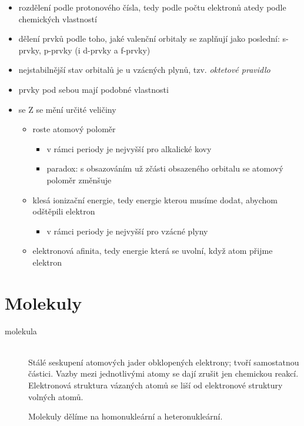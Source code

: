 \documentclass[DIV=8]{scrreprt}
\begin{document}
\begin{itemize}[nosep]
    \item rozdělení podle protonového čísla, tedy podle počtu elektronů atedy podle chemických vlastností
    \item dělení prvků podle toho, jaké valenční orbitaly se zaplňují jako poslední: s-prvky, p-prvky (i d-prvky a f-prvky)
    \item nejstabilnější stav orbitalů je u vzácných plynů, tzv. \emph{oktetové pravidlo}
    \item prvky pod sebou mají podobné vlastnosti
    \item se Z se mění určité veličiny
\begin{itemize}[nosep]
    \item roste atomový poloměr
\begin{itemize}[nosep]
    \item v rámci periody je nejvyšší pro alkalické kovy
    \item paradox: s obsazováním už zčásti obsazeného orbitalu se atomový poloměr změnšuje
\end{itemize}

    \item klesá ionizační energie, tedy energie kterou musíme dodat, abychom odštěpili elektron
\begin{itemize}[nosep]
    \item v rámci periody je nejvyšší pro vzácné plyny
\end{itemize}

    \item elektronová afinita, tedy energie která se uvolní, když atom přijme elektron
\end{itemize}

\end{itemize}



\section{Molekuly} \label{Molekuly}


\begin{description}
\item[molekula]\hfill \\
Stálé seskupení atomových jader obklopených elektrony; tvoří samostatnou částici. Vazby mezi jednotlivými atomy se dají zrušit jen chemickou reakcí. Elektronová struktura vázaných atomů se liší od elektronové struktury volných atomů.

Molekuly dělíme na homonukleární a heteronukleární.

\end{description}
\end{document}
